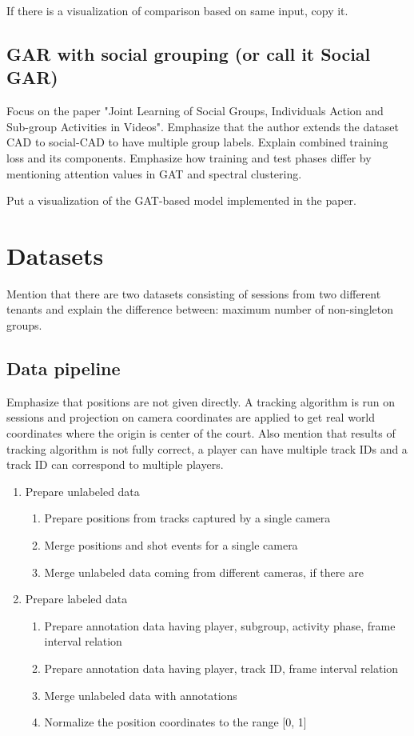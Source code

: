 \documentclass[doctype=mastersthesis,lang=english,BCOR=15mm,biblatex]{ldvbook}
\begin{document}
If there is a visualization of comparison based on same input, copy it.

\section{GAR with social grouping (or call it Social GAR)}

Focus on the paper "Joint Learning of Social Groups, Individuals Action and Sub-group Activities in Videos". Emphasize that the author extends the dataset CAD to social-CAD to have multiple group labels. Explain combined training loss and its components. Emphasize how training and test phases differ by mentioning attention values in GAT and spectral clustering.

Put a visualization of the GAT-based model implemented in the paper.

\chapter{Datasets}

Mention that there are two datasets consisting of sessions from two different tenants and explain the difference between: maximum number of non-singleton groups.

\section{Data pipeline}

Emphasize that positions are not given directly. A tracking algorithm is run on sessions and projection on camera coordinates are applied to get real world coordinates where the origin is center of the court. Also mention that results of tracking algorithm is not fully correct, a player can have multiple track IDs and a track ID can correspond to multiple players.

\begin{enumerate}
\item Prepare unlabeled data
\begin{enumerate}
    \item Prepare positions from tracks captured by a single camera
    \item Merge positions and shot events for a single camera
    \item Merge unlabeled data coming from different cameras, if there are
\end{enumerate}
\item Prepare labeled data
\begin{enumerate}
    \item Prepare annotation data having player, subgroup, activity phase, frame interval relation
    \item Prepare annotation data having player, track ID, frame interval relation
    \item Merge unlabeled data with annotations
    \item Normalize the position coordinates to the range [0, 1]
\end{enumerate}
\end{enumerate}
\end{document}
